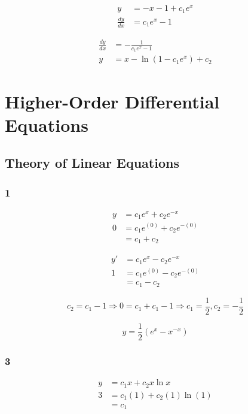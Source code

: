 \documentclass{article}
\begin{document}
\begin{align*}
  y             & = -x - 1 + c_1 e^x \\
  \frac{dy}{dx} & = c_1 e^x - 1
\end{align*}

\begin{align*}
  \frac{dy}{dx} & = -\frac{1}{c_1 e^x - 1}      \\
  y             & = x - \ln (1 - c_1 e^x) + c_2
\end{align*}

\section{Higher-Order Differential Equations}

\subsection{Theory of Linear Equations}

\subsubsection{1}

\begin{align*}
  y & = c_1 e^x + c_2 e^{-x}       \\
  0 & = c_1 e^{(0)} + c_2 e^{-(0)} \\
    & = c_1 + c_2
\end{align*}

\begin{align*}
  y' & = c_1 e^x - c_2 e^{-x}       \\
  1  & = c_1 e^{(0)} - c_2 e^{-(0)} \\
     & = c_1 - c_2
\end{align*}

\[c_2 = c_1 - 1 \Rightarrow 0 = c_1 + c_1 - 1 \Rightarrow c_1 = \frac{1}{2}, c_2 = -\frac{1}{2}\]

\[y = \frac{1}{2} (e^x - x^{-x})\]

\subsubsection{3}

\begin{align*}
  y & = c_1 x + c_2 x \ln x       \\
  3 & = c_1 (1) + c_2 (1) \ln (1) \\
    & = c_1
\end{align*}
\end{document}

